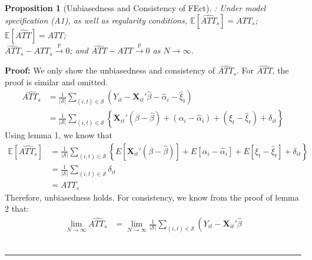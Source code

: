 \documentclass[12pt]{article}
\let\oldcenter\center
\let\oldendcenter\endcenter
\renewenvironment{center}{\setlength\topsep{0pt}\oldcenter}{\oldendcenter}
\newtheorem{proposition}{Proposition}
\newenvironment{proof}[1][Proof]{\noindent\textbf{#1:} }{\  \rule{0.5em}{0.5em}}
\newcommand{\E}{\mathbb{E}}
\begin{document}
\begin{proposition}[Unbiasedness and Consistency of FEct]: Under model specification (A1), as well as regularity conditions,
\begin{center}
    $\E[\widehat{ATT}_{s}] = ATT_{s}$; $\E[\widehat{ATT}] = ATT$;\\
    $\widehat{ATT}_{s} - ATT_{s} \overset{p}{\to} 0$; and $\widehat{ATT} - ATT \overset{p}{\to} 0$ as $N\to\infty$.
\end{center}\vspace{-1ex}
\end{proposition}



\begin{proof}
We only show the unbiasedness and consistency of $\widehat{ATT}_{s}$. For $\widehat{ATT}$, the proof is similar and omitted.
  \begin{align*}
    \widehat{ATT_{s}} & = \frac{1}{|\mathcal{S}|}
                        \sum_{(i,t) \in \mathcal{S}} \left( Y_{it} - \mathbf{X}_{it}'\hat\beta
                        - \hat\alpha_{i} - \hat\xi_{t} \right)\\
                      & = \frac{1}{|\mathcal{S}|}
                        \sum_{(i,t) \in \mathcal{S}} \left\lbrace
                        \mathbf{X}_{it}'(\beta-\hat{\beta}) +
                        (\alpha_{i} -\hat\alpha_{i})
                        + (\xi_{t} - \hat\xi_{t}) + \delta_{it} \right\rbrace  
  \end{align*}
  Using lemma 1, we know that
  \begin{align*}
   \E[\widehat{ATT_{s}}]  &= \frac{1}{|\mathcal{S}|}
                        \sum_{(i,t) \in \mathcal{S}} \left\lbrace
                        E[\mathbf{X}_{it}'(\beta-\hat{\beta})] +
                        E[\alpha_{i} -\hat\alpha_{i}]
                        + E[\xi_{t} - \hat\xi_{t}] + \delta_{it} \right\rbrace \\
                        & = \frac{1}{|\mathcal{S}|}
                        \sum_{(i,t) \in \mathcal{S}} 
                        \delta_{it} \\
                        & = ATT_{s}
  \end{align*}
Therefore, unbiasedness holds. For consistency, we know from the proof of lemma 2 that:
  \begin{align*}
 \lim_{N \rightarrow \infty}   \widehat{ATT_{s}} & =  \lim_{N \rightarrow \infty}\frac{1}{|\mathcal{S}|}
                        \sum_{(i,t) \in \mathcal{S}} \left( Y_{it} - \mathbf{X}_{it}'\hat\beta

\end{align*}
\end{proof}
\end{document}
